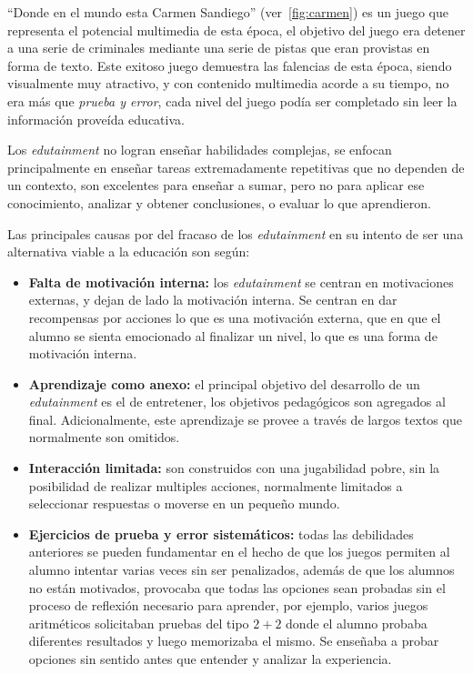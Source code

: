 \enquote{Donde en el mundo esta Carmen Sandiego} (ver~\ref{fig:carmen}) es un
juego que representa el potencial multimedia de esta época, el objetivo del
juego era detener a una serie de criminales mediante una serie de pistas que
eran provistas en forma de texto. Este exitoso juego demuestra las falencias de
esta época, siendo visualmente muy atractivo, y con contenido multimedia acorde
a su tiempo, no era más que \emph{prueba y error}, cada nivel del juego podía
ser completado sin leer la información proveída educativa\cite{charsky:2010}.

Los \emph{edutainment} no logran enseñar habilidades complejas, se enfocan
principalmente en enseñar tareas extremadamente repetitivas que no dependen de
un contexto\cite{charsky:2010,egenfeldt2007third,bruckman1999can}, son
excelentes para enseñar a sumar, pero no para aplicar ese conocimiento, analizar
y obtener conclusiones, o evaluar lo que aprendieron.

Las principales causas por del fracaso de los \emph{edutainment} en su intento
de ser una alternativa viable a la educación son según\cite{egenfeldt2007third}: 

\begin{itemize}

\item \textbf{Falta de motivación interna:} los \emph{edutainment} se centran en
    motivaciones externas, y dejan de lado la motivación interna. Se centran en
    dar recompensas por acciones lo que es una motivación externa, que en que el
    alumno se sienta emocionado al finalizar un nivel, lo que es una forma de
    motivación interna.

\item \textbf{Aprendizaje como anexo:} el principal objetivo del desarrollo de un
    \emph{edutainment} es el de entretener, los objetivos pedagógicos son
    agregados al final. Adicionalmente, este aprendizaje se provee a través de
    largos textos que normalmente son omitidos.

\item \textbf{Interacción limitada:} son construidos con una jugabilidad pobre,
    sin la posibilidad de realizar multiples acciones, normalmente limitados a
    seleccionar respuestas o moverse en un pequeño mundo. 

\item \textbf{Ejercicios de prueba y error sistemáticos:} todas las debilidades
    anteriores se pueden fundamentar en el hecho de que los juegos permiten al
    alumno intentar varias veces sin ser penalizados, además
    de que los alumnos no están motivados, provocaba que todas las opciones sean
    probadas sin el proceso de reflexión necesario para aprender, por ejemplo,
    varios juegos aritméticos solicitaban pruebas del tipo $2+2$ donde el alumno
    probaba diferentes resultados y luego memorizaba el mismo. Se enseñaba a
    probar opciones sin sentido antes que entender y analizar la experiencia.

\end{itemize}

